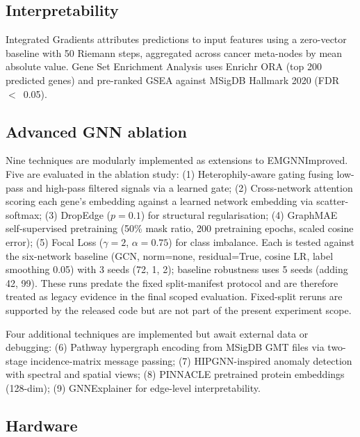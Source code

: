 \subsection{Interpretability}

Integrated Gradients\cite{ig2017} attributes predictions to input features using a
zero-vector baseline with 50 Riemann steps, aggregated across cancer meta-nodes by mean
absolute value. Gene Set Enrichment Analysis uses Enrichr ORA\cite{enrichr2013} (top 200
predicted genes) and pre-ranked GSEA\cite{gsea2005} against MSigDB Hallmark 2020\cite{msigdb2015}
(FDR~$<$~0.05).

\subsection{Advanced GNN ablation}

Nine techniques are modularly implemented as extensions to EMGNNImproved.
Five are evaluated in the ablation study:
(1) Heterophily-aware gating\cite{sgcd2024} fusing low-pass and high-pass filtered
signals via a learned gate;
(2) Cross-network attention scoring each gene's embedding against a learned network
embedding via scatter-softmax;
(3) DropEdge\cite{dropedge2020} ($p=0.1$) for structural regularisation;
(4) GraphMAE\cite{graphmae2022} self-supervised pretraining (50\% mask ratio, 200
pretraining epochs, scaled cosine error);
(5) Focal Loss\cite{focal2017} ($\gamma=2$, $\alpha=0.75$) for class imbalance.
Each is tested against the six-network baseline (GCN, norm=none, residual=True,
cosine LR, label smoothing 0.05) with 3 seeds (72, 1, 2); baseline robustness uses
5 seeds (adding 42, 99). These runs predate the fixed split-manifest protocol and are
therefore treated as legacy evidence in the final scoped evaluation. Fixed-split
reruns are supported by the released code but are not part of the present experiment
scope.

Four additional techniques are implemented but await external data or debugging:
(6) Pathway hypergraph encoding\cite{hgnn2019} from MSigDB GMT files via two-stage
incidence-matrix message passing;
(7) HIPGNN-inspired\cite{hipgnn2025} anomaly detection with spectral and spatial views;
(8) PINNACLE pretrained protein embeddings\cite{pinnacle2024} (128-dim);
(9) GNNExplainer\cite{gnnexplainer2019} for edge-level interpretability.

\subsection{Hardware}

